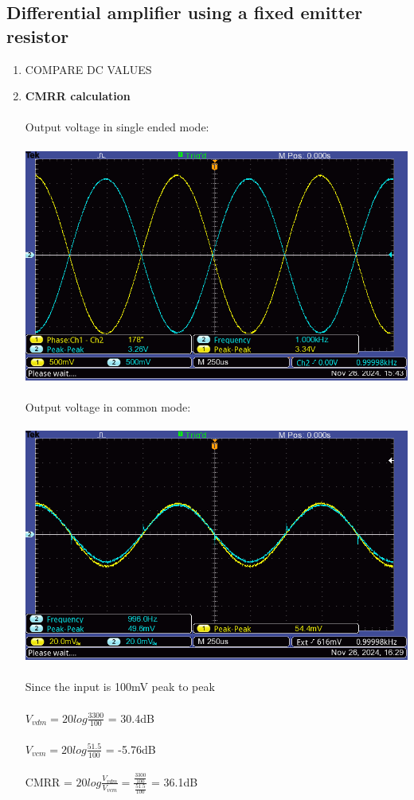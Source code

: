 \documentclass{article}
\begin{document}
	\subsection{Differential amplifier using a fixed emitter resistor}
		\begin{enumerate}
			\item COMPARE DC VALUES
			\item \textbf{CMRR calculation}\\\\
			Output voltage in single ended mode:\\\\
			\includegraphics[scale=0.5]{7.3.1.2 Collector Vs single/F0022TEK}\\\\
			Output voltage in common mode:\\\\
			\includegraphics[scale=0.5]{7.3.1.3 Collector Vs common/F0000TEK}\\\\
			Since the input is 100mV peak to peak\\\\ \(V_{vdm} = 20 log\frac{3300}{100}\) = 30.4dB\\\\
			\(V_{vcm} = 20 log\frac{51.5}{100}\) = -5.76dB\\\\
			CMRR = \(20log \frac{V_{vdm}}{V_{vcm}} = \frac{\frac{3300}{100}}{\frac{51.5}{100}} \) = 36.1dB\\\\
		\end{enumerate}
		\pagebreak
\end{document}
